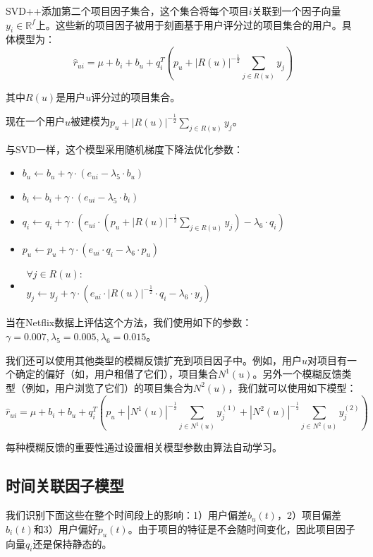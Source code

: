 \documentclass{article}
\begin{document}
 SVD++添加第二个项目因子集合，这个集合将每个项目$i$关联到一个因子向量$y_i\in\mathbb{R}^f$上。这些新的项目因子被用于刻画基于用户评分过的项目集合的用户。具体模型为：
 $$ \hat{r}_{ui}=\mu+b_i+b_u+q_i^T\left(p_u+|R(u)|^{-\frac{1}{2}}\mathop{\sum}\limits_{j\in R(u)}y_j\right) $$

 其中$R(u)$是用户$u$评分过的项目集合。

 现在一个用户$u$被建模为$p_u+|R(u)|^{-\frac{1}{2}}\mathop{\sum}_{j\in R(u)}y_j$。

 与SVD一样，这个模型采用随机梯度下降法优化参数：
 \begin{itemize}
 \item $b_u\leftarrow b_u+\gamma\cdot(e_{ui}-\lambda_5\cdot b_u)$
 \item $b_i\leftarrow b_i+\gamma\cdot(e_{ui}-\lambda_5\cdot b_i)$
 \item $q_i\leftarrow q_i+\gamma\cdot(e_{ui}\cdot (p_u+|R(u)|^{-\frac{1}{2}}\mathop{\sum}_{j\in R(u)}y_j)-\lambda_6\cdot q_i)$
 \item $p_u\leftarrow p_u+\gamma\cdot(e_{ui}\cdot q_i-\lambda_6\cdot p_u)$
 \item $\begin{array}{ll}
 \forall j\in R(u):\\
 y_j\leftarrow y_j+\gamma\cdot(e_{ui}\cdot|R(u)|^{-\frac{1}{2}}\cdot q_i-\lambda_6\cdot y_j)
 \end{array}
 $
 \end{itemize}

 当在Netflix数据上评估这个方法，我们使用如下的参数：$\gamma=0.007,\lambda_5=0.005,\lambda_6=0.015$。

 我们还可以使用其他类型的模糊反馈扩充到项目因子中。例如，用户$u$对项目有一个确定的偏好（如，用户租借了它们），项目集合$N^1(u)$。另外一个模糊反馈类型（例如，用户浏览了它们）的项目集合为$N^2(u)$，我们就可以使用如下模型：
 $$ \hat{r}_{ui}=\mu+b_i+b_u+q_i^T\left(p_u+|N^1(u)|^{-\frac{1}{2}}\mathop{\sum}\limits_{j\in N^1(u)}y^{(1)}_j+|N^2(u)|^{-\frac{1}{2}}\mathop{\sum}\limits_{j\in N^2(u)}y^{(2)}_j\right) $$

 每种模糊反馈的重要性通过设置相关模型参数由算法自动学习。

 \subsection{时间关联因子模型}
 我们识别下面这些在整个时间段上的影响：1）用户偏差$b_u(t)$，2）项目偏差$b_i(t)$和3）用户偏好$p_u(t)$。由于项目的特征是不会随时间变化，因此项目因子向量$q_i$还是保持静态的。
\end{document}
